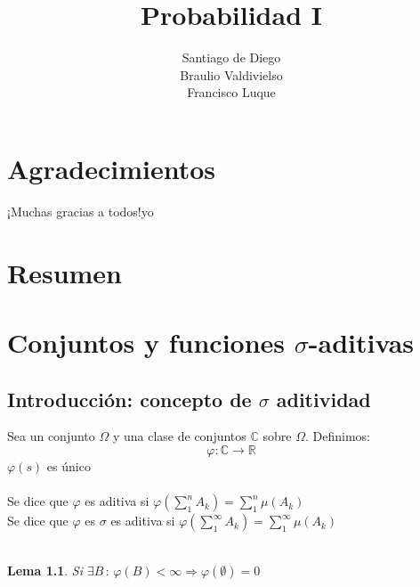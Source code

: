 \documentclass[12pt,a4paper,openright]{book}
\author{Santiago de Diego\\Braulio Valdivielso\\Francisco Luque}
\title{Probabilidad I}
\date{}
\begin{document}
\maketitle
\newtheorem{theorem}{Teorema}[section]
\newtheorem{lemma}{Lema}[section]
\newtheorem{proof}{Demostración}[section]
\newpage
\chapter*{Agradecimientos} %
 
¡Muchas gracias a todos!yo

\chapter*{Resumen} %

\tableofcontents
\chapter{Conjuntos y funciones $\sigma$-aditivas}
\section{Introducción: concepto de $\sigma$ aditividad}
Sea un conjunto $\Omega$ y una clase de conjuntos $\mathbb{C}$ sobre $\Omega$. Definimos:
$$\varphi : \mathbb{C}\rightarrow \mathbb{R}$$
$\varphi (s)$ es único\\\\
Se dice que $\varphi$ es aditiva si $\varphi(\displaystyle\sum_{1}^{n}A_k)=\displaystyle\sum_1^n\mu(A_k)$\\
Se dice que $\varphi$ es $\sigma$ es aditiva si $\varphi(\displaystyle\sum_1^\infty A_k)=\displaystyle\sum_1^\infty \mu(A_k)$\\\\
\begin{lemma} 
Si $\exists B\, : \, \varphi(B)<\infty \Rightarrow \varphi(\emptyset)=0$\\\\
\end{lemma}
\end{document}
